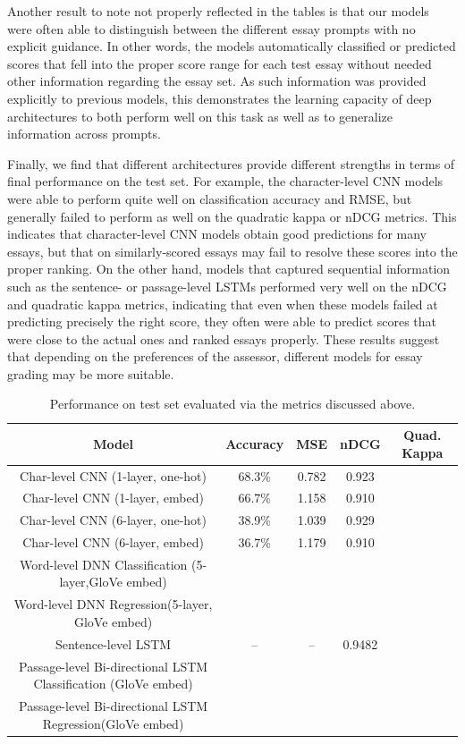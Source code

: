 \documentclass[10pt,psamsfonts]{amsart}
\theoremstyle{definition}
\theoremstyle{remark}
\numberwithin{equation}{section}
\begin{document}
Another result to note not properly reflected in the tables is that our models were often able to distinguish between the different essay prompts with no explicit guidance. In other words, the models automatically classified or predicted scores that fell into the proper score range for each test essay without needed other information regarding the essay set. As such information was provided explicitly to previous models, this demonstrates the learning capacity of deep architectures to both perform well on this task as well as to generalize information across prompts.

Finally, we find that different architectures provide different strengths in terms of final performance on the test set. For example, the character-level CNN models were able to perform quite well on classification accuracy and RMSE, but generally failed to perform as well on the quadratic kappa or nDCG metrics. This indicates that character-level CNN models obtain good predictions for many essays, but that on similarly-scored essays may fail to resolve these scores into the proper ranking. On the other hand, models that captured sequential information such as the sentence- or passage-level LSTMs performed very well on the nDCG and quadratic kappa metrics, indicating that even when these models failed at predicting precisely the right score, they often were able to predict scores that were close to the actual ones and ranked essays properly. These results suggest that depending on the preferences of the assessor, different models for essay grading may be more suitable.


\begin{table}
	\begin{tabular}{c|c|c|c|c}
		Model & Accuracy & MSE & nDCG & Quad. Kappa \\\hline
		Char-level CNN (1-layer, one-hot) & 68.3\% & 0.782 & 0.923 \\
		Char-level CNN (1-layer, embed) & 66.7\% & 1.158& 0.910\\
		Char-level CNN (6-layer, one-hot) & 38.9\% & 1.039 & 0.929 \\
		Char-level CNN (6-layer, embed) & 36.7\%& 1.179 & 0.910 \\
		Word-level DNN Classification (5-layer,GloVe embed) & & &  \\
		Word-level DNN Regression(5-layer, GloVe embed) & & &  \\
		Sentence-level LSTM & -- & -- & 0.9482 \\
		Passage-level Bi-directional LSTM Classification (GloVe embed) & & &  \\
		Passage-level Bi-directional LSTM Regression(GloVe embed) & & & 
		
	\end{tabular}
	\caption{Performance on test set evaluated via the metrics discussed above.}
	\label{fig:eval}
\end{table}
\end{document}
